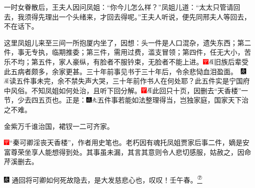 一时女眷散后，王夫人因问凤姐：``你今儿怎么样？''凤姐儿道：``太太只管请回去，我须得先理出一个头绪来，才回去得呢。''王夫人听说，便先同邢夫人等回去，不在话下。

这里凤姐儿来至三间一所抱厦内坐了，因想：头一件是人口混杂，遗失东西；第二件，事无专执，临期推委；第三件，需用过费，滥支冒领；第四件，任无大小，苦乐不均；第五件，家人豪纵，有脸者不服钤束，无脸者不能上进。{\includegraphics[width=3mm]{../Images/00002}\includegraphics[width=3mm]{../Images/00010}\footnotesize \kaishu 旧族后辈受此五病者颇多，余家更甚。三十年前事见书于三十年后，令余悲恸血泪盈面。　\includegraphics[width=3mm]{../Images/00004}\includegraphics[width=3mm]{../Images/00010}\footnotesize \kaishu 读五件事未完，余不禁失声大哭，三十年前作书人在何处耶？}此五件实是宁国府中风俗。不知凤姐如何处治，且听下回分解。{\includegraphics[width=3mm]{../Images/00002}\includegraphics[width=3mm]{../Images/00010}\footnotesize \kaishu 此回只十页，因删去``天香楼''一节，少去四五页也。}正是：{\includegraphics[width=3mm]{../Images/00005}\includegraphics[width=3mm]{../Images/00012}\footnotesize \kaishu 五件事若能如法整理得当，岂独家庭，国家天下治之不难。}

金紫万千谁治国，裙钗一二可齐家。

{\includegraphics[width=3mm]{../Images/00002}``秦可卿淫丧天香楼''，作者用史笔也。老朽因有魂托凤姐贾家后事二件，嫡是安富尊荣坐享人能想得到处。其事虽未漏，其言其意则令人悲切感服，姑赦之，因命芹溪删去。}

{\includegraphics[width=3mm]{../Images/00004}  \kaishu 通回将可卿如何死故隐去，是大发慈悲心也，叹叹！壬午春。}\href{../Text/part0017_split_000.html\#lnkback_7_a}{\textsuperscript{⑦}}

